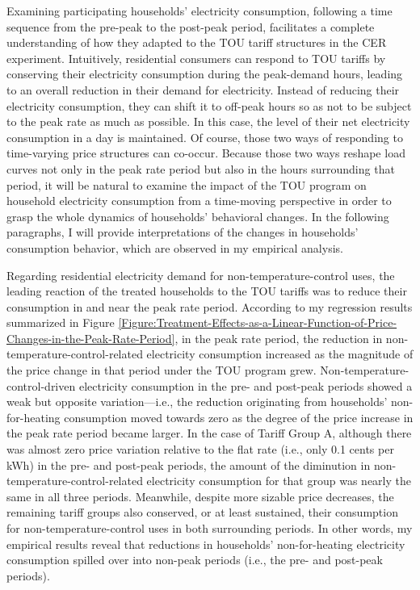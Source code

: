 Examining participating households' electricity consumption, following a time sequence from the pre-peak to the post-peak period, facilitates a complete understanding of how they adapted to the TOU tariff structures in the CER experiment. Intuitively, residential consumers can respond to TOU tariffs by conserving their electricity consumption during the peak-demand hours, leading to an overall reduction in their demand for electricity. Instead of reducing their electricity consumption, they can shift it to off-peak hours so as not to be subject to the peak rate as much as possible. In this case, the level of their net electricity consumption in a day is maintained. Of course, those two ways of responding to time-varying price structures can co-occur. Because those two ways reshape load curves not only in the peak rate period but also in the hours surrounding that period, it will be natural to examine the impact of the TOU program on household electricity consumption from a time-moving perspective in order to grasp the whole dynamics of households' behavioral changes. In the following paragraphs, I will provide interpretations of the changes in households' consumption behavior, which are observed in my empirical analysis. 

Regarding residential electricity demand for non-temperature-control uses, the leading reaction of the treated households to the TOU tariffs was to reduce their consumption in and near the peak rate period. According to my regression results summarized in Figure \ref{Figure:Treatment-Effects-as-a-Linear-Function-of-Price-Changes-in-the-Peak-Rate-Period}, in the peak rate period, the reduction in non-temperature-control-related electricity consumption increased as the magnitude of the price change in that period under the TOU program grew. Non-temperature-control-driven electricity consumption in the pre- and post-peak periods showed a weak but opposite variation---i.e., the reduction originating from households' non-for-heating consumption moved towards zero as the degree of the price increase in the peak rate period became larger. In the case of Tariff Group A, although there was almost zero price variation relative to the flat rate (i.e., only 0.1 cents per kWh) in the pre- and post-peak periods, the amount of the diminution in non-temperature-control-related electricity consumption for that group was nearly the same in all three periods. Meanwhile, despite more sizable price decreases, the remaining tariff groups also conserved, or at least sustained, their consumption for non-temperature-control uses in both surrounding periods. In other words, my empirical results reveal that reductions in households' non-for-heating electricity consumption spilled over into non-peak periods (i.e., the pre- and post-peak periods). 

